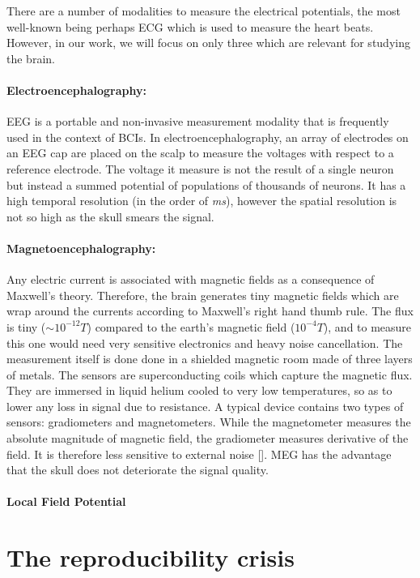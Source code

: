 There are a number of modalities to measure the electrical potentials, the most well-known being perhaps \ac{ECG} which is used to measure the heart beats. However, in our work, we will focus on only three which are relevant for studying the brain.

\paragraph{Electroencephalography: } \Ac{EEG} is a portable and non-invasive measurement modality that is frequently used in the context of \acp{BCI}. In electroencephalography, an array of electrodes on an \ac{EEG} cap are placed on the scalp to measure the voltages with respect to a reference electrode. The voltage it measure is not the result of a single neuron but instead a summed potential of populations of thousands of neurons. It has a high temporal resolution (in the order of \emph{ms}), however the spatial resolution is not so high as the skull smears the signal.

\paragraph{Magnetoencephalography: } Any electric current is associated with magnetic fields as a consequence of Maxwell's theory. Therefore, the brain generates tiny magnetic fields which are wrap around the currents according to Maxwell's right hand thumb rule. The flux is tiny ($\sim10^{-12}T$) compared to the earth's magnetic field ($10^{-4}T$), and to measure this one would need very sensitive electronics and heavy noise cancellation. The measurement itself is done done in a shielded magnetic room made of three layers of metals. The sensors are superconducting coils which capture the magnetic flux. They are immersed in liquid helium cooled to very low temperatures, so as to lower any loss in signal due to resistance. A typical device contains two types of sensors: gradiometers and magnetometers. While the magnetometer measures the absolute magnitude of magnetic field, the gradiometer measures derivative of the field. It is therefore less sensitive to external noise []. MEG has the advantage that the skull does not deteriorate the signal quality.

\paragraph{Local Field Potential}

\section{The reproducibility crisis}

